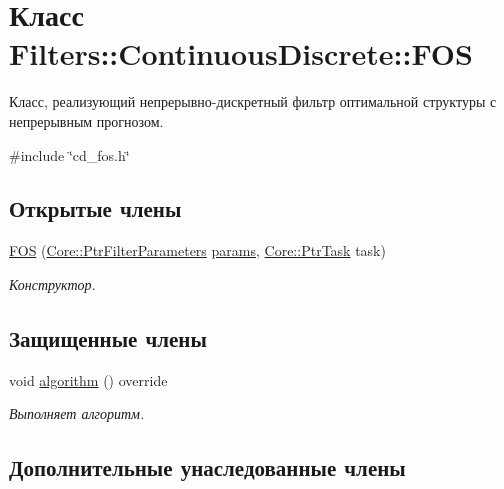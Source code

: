 \hypertarget{class_filters_1_1_continuous_discrete_1_1_f_o_s}{}\section{Класс Filters\+:\+:Continuous\+Discrete\+:\+:F\+OS}
\label{class_filters_1_1_continuous_discrete_1_1_f_o_s}


Класс, реализующий непрерывно-\/дискретный фильтр оптимальной структуры с непрерывным прогнозом.  




{\ttfamily \#include \char`\"{}cd\+\_\+fos.\+h\char`\"{}}

\subsection*{Открытые члены}
\begin{DoxyCompactItemize}
\item 
\hypertarget{class_filters_1_1_continuous_discrete_1_1_f_o_s_a969ba843b1c5df806d4eb1054d16f4f9}{}\label{class_filters_1_1_continuous_discrete_1_1_f_o_s_a969ba843b1c5df806d4eb1054d16f4f9} 
\hyperlink{class_filters_1_1_continuous_discrete_1_1_f_o_s_a969ba843b1c5df806d4eb1054d16f4f9}{F\+OS} (\hyperlink{namespace_core_a4811af8148ba137d644b9a61a042cf03}{Core\+::\+Ptr\+Filter\+Parameters} \hyperlink{class_core_1_1_filter_a44aa749b49ba46256975ce545531ecf7}{params}, \hyperlink{namespace_core_abfda8f69fcacfcea2696549b548ed737}{Core\+::\+Ptr\+Task} task)
\begin{DoxyCompactList}\small\item\em Конструктор. \end{DoxyCompactList}\end{DoxyCompactItemize}
\subsection*{Защищенные члены}
\begin{DoxyCompactItemize}
\item 
void \hyperlink{class_filters_1_1_continuous_discrete_1_1_f_o_s_a1e3d6f40678f13a33971bc7bceb45496}{algorithm} () override
\begin{DoxyCompactList}\small\item\em Выполняет алгоритм. \end{DoxyCompactList}\end{DoxyCompactItemize}
\subsection*{Дополнительные унаследованные члены}


